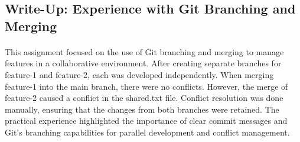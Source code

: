 \documentclass[a4paper,12pt]{article}
\begin{document}
\subsection*{\Huge{Write-Up: Experience with Git Branching and Merging}}
\hspace{1 cm}
\paragraph {\noindent}{This assignment focused on the use of Git branching and merging to manage features in a collaborative environment. After creating separate branches for feature-1 and feature-2, each was developed independently.
When merging feature-1 into the main branch, there were no conflicts. However, the merge of feature-2 caused a conflict in the shared.txt file. Conflict resolution was done manually, ensuring that the changes from both branches were retained.
The practical experience highlighted the importance of clear commit messages and Git’s branching capabilities for parallel development and conflict management.}
\end{document}
